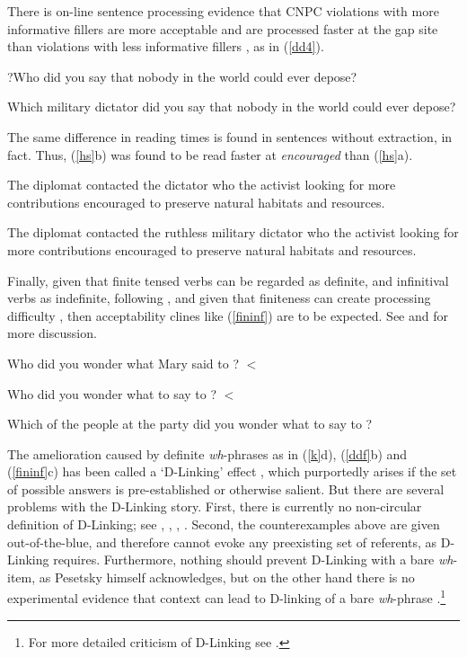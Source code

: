 \documentclass[output=paper]{langsci/langscibook}
\begin{document}
\indent
There is on-line sentence processing evidence that   CNPC   violations  with more informative  fillers are more acceptable and are processed faster at the gap site than violations with less informative fillers \citep{hofsaglang}, as in  (\ref{dd4}).
 
\ea \label{dd4}
\ea ?Who  did you say that nobody in the world could ever depose?
\item Which  military dictator did you say that nobody in the world 
could ever depose?
\z
\z


\noindent
The same difference in reading times  is found in sentences without extraction, in fact. Thus,   (\ref{hs}b) was found to be read faster at \emph{encouraged} than (\ref{hs}a).
 
\ea \label{hs}
 \ea The diplomat contacted the dictator who the activist looking for more contributions encouraged to preserve natural habitats and resources.
 
 \item The diplomat contacted the ruthless military dictator who the activist looking for more contributions encouraged to preserve natural habitats and resources.
 \z
\z

\noindent
Finally, given that  finite tensed verbs can be regarded as definite, and infinitival verbs as indefinite,
 following \citet{partee84}, and given that finiteness can create processing difficulty 
 \citep{kluender92,gibson0000}, then acceptability clines like 
(\ref{fininf}) are to be expected. See \citet[ch.5]{levhubook} and \citet[308]{levine17} for more discussion.

\ea 
\ea Who did you wonder what Mary said to \spc?  $<$
\item Who did you wonder what to say to \spc?  $<$
\item Which of the people at the party did you wonder what to say to \spc? 
\z \label{fininf}
\z

The amelioration caused by definite {\it wh}-phrases as in  (\ref{k}d), (\ref{ddf}b) and (\ref{fininf}c) 
has been called a `D-Linking' effect  \citep{pesetskydlink,pesetskybook}, which purportedly arises if the set of possible answers is pre-established or otherwise salient. But there are several problems with the D-Linking story.   First, there is currently no non-circular definition of D-Linking; see 
\citet[16]{pesetskybook},
 \citet[247--250]{ginzsag}, 
 \citet[33, 39]{chung94},
\citet[242, 268--271]{levhubook}. Second, the counterexamples above are given out-of-the-blue, and therefore cannot evoke any preexisting set of referents, as D-Linking 
requires.   Furthermore, nothing should prevent D-Linking with a bare {\it wh}-item, as Pesetsky himself acknowledges, but on the other hand there is no experimental evidence that context can lead to D-linking of a bare {\it wh}-phrase \citep{sprousediss07,villata}.\footnote{For more detailed criticism of D-Linking see \citet{hof2007}.}
\end{document}
